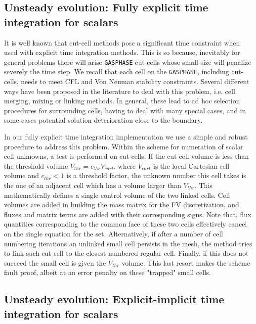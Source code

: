 \subsection{Unsteady evolution: Fully explicit time integration for scalars} \label{sec:exscl}

It is well known that cut-cell methods pose a significant time constraint when used with explicit time integration methods.
This is so because, inevitably for general problems there will arise \texttt{GASPHASE} cut-cells whose small-size will penalize
severely the time step. We recall that each cell on the \texttt{GASPHASE}, including cut-cells, needs to meet CFL and Von Neuman stability constraints. Several different ways have been proposed in the literature to deal with this problem, i.e. cell merging, mixing or linking methods. In general, these lead to ad hoc selection procedures for surrounding cells, having to deal with many special cases, and in some cases potential solution deterioration close to the boundary.

In our fully explicit time integration implementation we use a simple and robust procedure to address this problem. Within the scheme for numeration of scalar cell unknowns, a test is performed on cut-cells. If the cut-cell volume is less than the threshold volume $V_{thr}= c_{thr} V_{cart}$, where $V_{cart}$ is the local Cartesian cell volume and $c_{thr}<1$ is a threshold factor, the unknown number this cell takes is the one of an adjacent cell which has a volume larger than $V_{thr}$. This mathematically defines a single control volume of the two linked cells. Cell volumes are added in building the mass matrix for the FV discretization, and fluxes and matrix terms are added with their corresponding signs. Note that, flux quantities corresponding to the common face of these two cells effectively cancel on the single equation for the set.
Alternatively, if after a number of cell numbering iterations an unlinked small cell persists in the mesh, the method tries to link such cut-cell to the closest numbered regular cell. Finally, if this does not succeed the small cell is given the $V_{thr}$ volume. This last resort makes the scheme fault proof, albeit at an error penalty on these "trapped" small cells.



\subsection{Unsteady evolution: Explicit-implicit time integration for scalars} \label{sec:eximscl}


